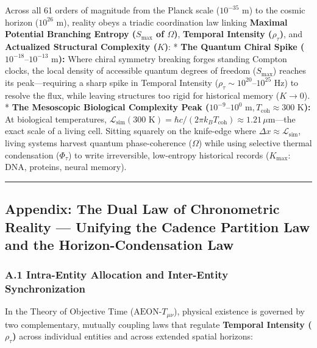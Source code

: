 \documentclass[
]{article}
\begin{document}
Across all 61 orders of magnitude from the Planck scale
(\(10^{-35}\text{ m}\)) to the cosmic horizon (\(10^{26}\text{ m}\)),
reality obeys a triadic coordination law linking \textbf{Maximal
Potential Branching Entropy (\(S_{\text{max}}\) of \(\Omega\))},
\textbf{Temporal Intensity (\(\rho_\tau\))}, and \textbf{Actualized
Structural Complexity (\(K\))}: * \textbf{The Quantum Chiral Spike
(\(10^{-18}\text{--}10^{-13}\text{ m}\)):} Where chiral symmetry
breaking forges standing Compton clocks, the local density of accessible
quantum degrees of freedom (\(S_{\text{max}}\)) reaches its
peak---requiring a sharp spike in Temporal Intensity
(\(\rho_\tau \sim 10^{20}\text{--}10^{25}\text{ Hz}\)) to resolve the
flux, while leaving structures too rigid for historical memory
(\(K \to 0\)). * \textbf{The Mesoscopic Biological Complexity Peak
(\(10^{-9}\text{--}10^{0}\text{ m}, T_{\text{coh}} \approx 300\text{ K}\)):}
At biological temperatures,
\(\mathcal{L}_{\text{sim}}(300\text{ K}) = \hbar c / (2\pi k_B T_{\text{coh}}) \approx 1.21\,\mu\text{m}\)---the
exact scale of a living cell. Sitting squarely on the knife-edge where
\(\Delta x \approx \mathcal{L}_{\text{sim}}\), living systems harvest
quantum phase-coherence (\(\Omega\)) while using selective thermal
condensation (\(\Phi_\tau\)) to write irreversible, low-entropy
historical records (\(K_{\text{max}}\): DNA, proteins, neural memory).

\begin{center}\rule{0.5\linewidth}{0.5pt}\end{center}

\subsection{Appendix: The Dual Law of Chronometric Reality --- Unifying
the Cadence Partition Law and the Horizon-Condensation
Law}\label{appendix-the-dual-law-of-chronometric-reality-unifying-the-cadence-partition-law-and-the-horizon-condensation-law}

\subsubsection{A.1 Intra-Entity Allocation and Inter-Entity
Synchronization}\label{a.1-intra-entity-allocation-and-inter-entity-synchronization}

In the Theory of Objective Time (\(\text{AEON-}T_{\mu\nu}\)), physical
existence is governed by two complementary, mutually coupling laws that
regulate \textbf{Temporal Intensity (\(\rho_\tau\))} across individual
entities and across extended spatial horizons:
\end{document}

